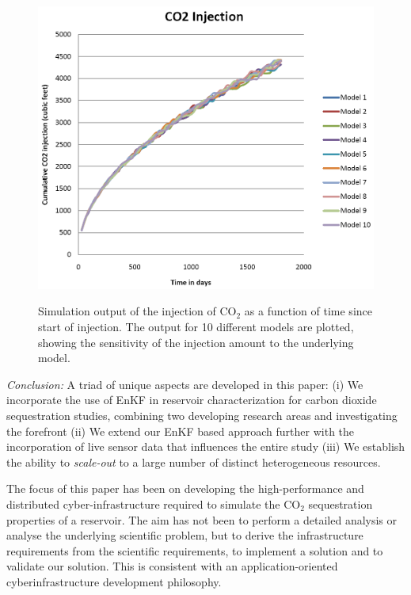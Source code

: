 \documentclass{acm_proc_article-sp}
\newcommand{\jhanote}[1]{ {\textcolor{red} { ***Jha: #1 }}}
\newcommand{\jhanote}[1]{}
\begin{document}
\begin{figure}
\begin{center}\
\includegraphics[scale=0.33]{figures/co2seq.png}
\end{center}
\caption[Simulation Output]{Simulation output of the injection of
  CO$_2$ as a function of time since start of injection. The output for 10  different models are
  plotted, showing the sensitivity of the injection amount to the
  underlying model.}
\label{fig:SensorRelay}
\end{figure}


{\it Conclusion: }A triad of unique aspects are developed in this
paper: (i) We incorporate the use of EnKF in reservoir
characterization for carbon dioxide sequestration studies, combining
two developing research areas and investigating the forefront (ii) We
extend our EnKF based approach further with the incorporation of live
sensor data that influences the entire study (iii) We establish the
ability to {\it scale-out} to a large number of distinct heterogeneous
resources.

The focus of this paper has been on developing the high-performance
and distributed cyber-infrastructure required to simulate the CO$_2$
sequestration properties of a reservoir. The aim has not been to
perform a detailed analysis or analyse the underlying scientific
problem, but to derive the infrastructure requirements from the
scientific requirements, to implement a solution and to validate our
solution. This is consistent with an application-oriented
cyberinfrastructure development philosophy.


%


\end{document}
